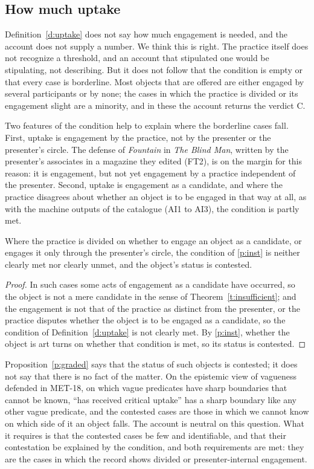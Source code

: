 \documentclass{situationist-preprint}
\begin{document}
\subsection{How much uptake}

Definition~\ref{d:uptake} does not say how much engagement is needed, and the account does not supply a number. We think this is right. The practice itself does not recognize a threshold, and an account that stipulated one would be stipulating, not describing. But it does not follow that the condition is empty or that every case is borderline. Most objects that are offered are either engaged by several participants or by none; the cases in which the practice is divided or its engagement slight are a minority, and in these the account returns the verdict C.

Two features of the condition help to explain where the borderline cases fall. First, uptake is engagement by the practice, not by the presenter or the presenter's circle. The defense of \emph{Fountain} in \emph{The Blind Man}, written by the presenter's associates in a magazine they edited (FT2), is on the margin for this reason: it is engagement, but not yet engagement by a practice independent of the presenter. Second, uptake is engagement as a candidate, and where the practice disagrees about whether an object is to be engaged in that way at all, as with the machine outputs of the catalogue (AI1 to AI3), the condition is partly met.

\begin{proposition}\label{p:graded}
Where the practice is divided on whether to engage an object as a candidate, or engages it only through the presenter's circle, the condition of \ref{p:inst} is neither clearly met nor clearly unmet, and the object's status is contested.
\end{proposition}

\begin{proof}
In such cases some acts of engagement as a candidate have occurred, so the object is not a mere candidate in the sense of Theorem~\ref{t:insufficient}; and the engagement is not that of the practice as distinct from the presenter, or the practice disputes whether the object is to be engaged as a candidate, so the condition of Definition~\ref{d:uptake} is not clearly met. By \ref{p:inst}, whether the object is art turns on whether that condition is met, so its status is contested.
\end{proof}

Proposition~\ref{p:graded} says that the status of such objects is contested; it does not say that there is no fact of the matter. On the epistemic view of vagueness defended in MET-18, on which vague predicates have sharp boundaries that cannot be known, \enquote{has received critical uptake} has a sharp boundary like any other vague predicate, and the contested cases are those in which we cannot know on which side of it an object falls. The account is neutral on this question. What it requires is that the contested cases be few and identifiable, and that their contestation be explained by the condition, and both requirements are met: they are the cases in which the record shows divided or presenter-internal engagement.
\end{document}
